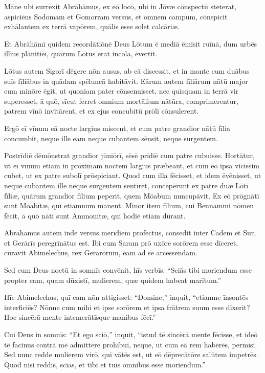 \Versus Māne ubi surrēxit Abrāhāmus, ex eō locō, ubi in Jōvæ cōnspectū steterat,
\Versus aspiciēns Sodomam et Gomorram versus, et omnem campum, cōnspicit exhālantem ex terrā vapōrem, quālis esse solet calcāriæ.

\Versus Et Abrāhāmī quidem recordātiōnē Deus Lōtum ē mediā ēmīsit ruīnā, dum urbēs illīus plānitiēī, quārum Lōtus erat incola, ēvertit.

\Versus Lōtus autem Sigorī dēgere nōn ausus, ab eā discessit, et in monte cum duābus suīs fīliābus in quādam spēluncā habitāvit.
\Versus Eārum autem fīliārum nātū major cum minōre ēgit, ut quoniam pater cōnsenuisset, nec quisquam in terrā vir superesset, ā quō, sīcut ferret omnium mortālium nātūra, comprimerentur,
\Versus patrem vīnō invītārent, et ex ejus concubitū prōlī cōnsulerent.

\Versus Ergō eī vīnum eā nocte largius miscent, et cum patre grandior nātū fīlia concumbit, neque ille eam neque cubantem sēnsit, neque surgentem.

\Versus Postrīdiē dēmōnstrat grandior jūniōrī, sēsē prīdiē cum patre cubuisse. Hortātur, ut eī vīnum etiam in proximam noctem largius præbeant, et cum eō ipsa vicissim cubet, ut ex patre subolī prōspiciant.
\Versus Quod cum illa fēcisset, et idem ēvēnisset, ut neque cubantem ille neque surgentem sentīret,
\Versus concēpērunt ex patre duæ Lōtī fīliæ,
\Versus quārum grandior fīlium peperit, quem Mōabum nuncupāvit. Ex eō prōgnātī sunt Mōabītæ, quī etiamnum manent.
\Versus Minor item fīlium, cui Bennammi nōmen fēcit, ā quō nātī sunt Ammonītæ, quī hodiē etiam dūrant.



\Caput
\Versus Abrāhāmus autem inde versus merīdiem profectus, cōnsēdit inter Cadem et Sur, et Gerārīs peregrīnātus est.
\Versus Ibi cum Saram prō uxōre sorōrem esse dīceret, cūrāvit Abimelechus, rēx Gerārōrum, eam ad sē arcessendam.

\Versus Sed eum Deus noctū in somnīs convēnit, hīs verbīs: ``Sciās tibi moriendum esse propter eam, quam dūxistī, mulierem, quæ quidem habeat marītum.''

\Versus Hīc Abimelechus, quī eam nōn attigisset: ``Domine,'' inquit, ``etiamne īnsontēs interficiēs?
\Versus Nōnne cum mihi et ipse sorōrem et ipsa frātrem suum esse dīxerit? Hoc sincērā mente intemerātīsque manibus fēcī.''

\Versus Cui Deus in somnīs: ``Et ego sciō,'' inquit, ``istud tē sincērā mente fēcisse, et ideō tē facinus contrā mē admittere prohibuī, neque, ut cum eā rem habērēs, permīsī.
\Versus Sed nunc redde mulierem virō, quī vātēs est, ut eō dēprecātōre salūtem impetrēs. Quod nisi reddis, sciās, et tibi et tuīs omnibus esse moriendum.''

